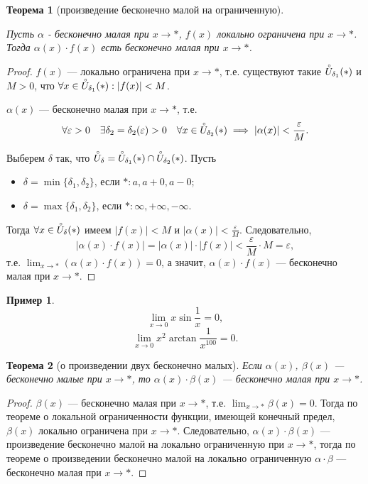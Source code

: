 \documentclass[a4paper,12pt]{article} %
\newtheorem{theorem}{Теорема}[section]
\theoremstyle{remark}
\theoremstyle{definition}
\newtheorem{exmp}{Пример}[section]
\begin{document}
\begin{theorem}[произведение бесконечно малой на ограниченную]\

	\noindent Пусть $\alpha$ - бесконечно малая при $x \to *$, $f(x)$ локально ограничена при  $x\to *$.
    Тогда $\alpha(x)\cdot f(x)$ есть бесконечно малая при $x\to *$.
\end{theorem}
\begin{proof}
    $f(x)$ --- локально ограничена при $x\to *$, т.е. существуют такие $\accentset{\circ}{U}_{\delta_1}(*)$ и $M>0$,
    что $\forall x \in \accentset{\circ}{U}_{\delta_1}(*) : |f(x)| < M$.

    $\alpha(x)$ --- бесконечно малая при $x \to  *$, т.е.
    \[\forall \varepsilon> 0 \quad \exists \delta_2=\delta_2(\varepsilon)>0 \quad \forall x\in \accentset    
    {\circ}{U}_{\delta_2}(*) \implies |\alpha(x)| < \frac{\varepsilon}{M}.\] 

    Выберем $\delta$ так, что $\accentset{\circ}{U}_\delta=\accentset{\circ}{U}_{\delta_1}(*)\cap 
    \accentset{\circ}{U}_{\delta_2}(*)$.  Пусть 
    \begin{itemize}
        \item $\delta = \min \{\delta_1, \delta_2\} $, если $*: a, a + 0, a - 0$;
        \item $\delta=\max \{\delta_1, \delta_2\} $, если $*: \infty, +\infty, -\infty$.
    \end{itemize}
    Тогда $\forall x\in \accentset{\circ}{U}_\delta(*)$ имеем $|f(x)|<M$ и $\displaystyle |\alpha(x)| < \frac{\varepsilon}{M}$.
    Следовательно,
    \[|\alpha(x)\cdot f(x)| = |\alpha(x)| \cdot |f(x)| < \frac{\varepsilon}{M} \cdot M = \varepsilon,\] 
    т.е. $\displaystyle \lim_{x \to *} (\alpha(x)\cdot f(x)) = 0$, а значит, $\alpha(x) \cdot f(x)$ 
    --- бесконечно малая при $x\to *$.
\end{proof}
\begin{exmp}
    \[ \lim_{x \to 0} x \sin{\frac{1}{x}} = 0 ,\] 
    \[ \lim_{x \to 0} x^2 \arctan{\frac{1}{x^{100}}} = 0 .\] 
\end{exmp}

\begin{theorem}[о произведении двух бесконечно малых]
	Если $\alpha(x)$, $\beta(x)$ --- бесконечно малые при $x \to *$, то $\alpha(x)\cdot \beta(x)$ 
    --- бесконечно малая при $x \to *$.
\end{theorem}
\begin{proof}
	$\beta(x)$ --- бесконечно малая при $x \to  *$, т.е. $\displaystyle  \lim_{x \to *} \beta(x) = 0$.
    Тогда по теореме о локальной ограниченности функции, имеющей конечный предел, $\beta(x)$ локально ограничена при $x\to *$.
    Следовательно, $\alpha(x)\cdot \beta(x)$ --- произведение бесконечно малой на локально ограниченную при $x\to *$,
    тогда по теореме о произведении бесконечно малой на локально ограниченную $\alpha\cdot \beta$ 
    --- бесконечно малая при $x \to *$.
\end{proof}
\end{document}
